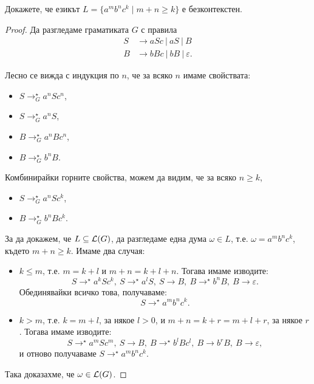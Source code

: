 \begin{framed}
  \begin{problem}
    Докажете, че езикът $L = \{a^mb^nc^k\mid m+n \geq k\}$ е безконтекстен.
  \end{problem}  
\end{framed}
\begin{proof}
  Да разгледаме граматиката $G$ с правила
  \begin{align*}
    S& \rightarrow aSc\ |\ aS\ |\ B\\
    B& \rightarrow bBc\ |\  bB\ |\ \varepsilon.
  \end{align*}
  
  Лесно се вижда с индукция по $n$, че за всяко $n$ имаме свойствата:
  \begin{itemize}
  \item 
    $S \rightarrow^\star_G a^nSc^n$,
  \item
    $S \rightarrow^\star_G a^nS$,
  \item
    $B \rightarrow^\star_G a^nBc^n$,
  \item
    $B \rightarrow^\star_G b^nB$.
  \end{itemize}
  Комбинирайки горните свойства, можем да видим, че за всяко $n \geq k$,
  \begin{itemize}
  \item 
    $S \rightarrow^\star_G a^nSc^k$,
  \item
    $B \rightarrow^\star_G b^nBc^k$.
  \end{itemize}
  За да докажем, че $L \subseteq \mathcal{L}(G)$, 
  да разгледаме една дума $\omega \in L$, т.е. $\omega = a^mb^nc^k$, където $m+n \geq k$.
  Имаме два случая:
  \begin{itemize}
  \item 
    $k \leq m$, т.е. $m = k+l$ и $m+n = k+l+n$.
    Тогава имаме изводите:
    \[S \rightarrow^\star a^kSc^k,\ S \rightarrow^\star a^lS,\ S \rightarrow B,\ B \rightarrow^\star b^nB,\ B \rightarrow \varepsilon.\]
    Обединявайки всичко това, получаваме:
    \[S \rightarrow^\star a^mb^nc^k.\]
  \item
    $k > m$, т.е. $k = m+l$, за някое $l > 0$, и $m+n = k+r = m+l+r$, за някое $r$.
    Тогава имаме изводите:
    \[S \rightarrow^\star a^mSc^m,\ S\rightarrow B,\ B\rightarrow^\star b^lBc^l,\ B\rightarrow b^rB,\ B\rightarrow\varepsilon,\]
    и отново получаваме $S \rightarrow^\star a^mb^nc^k$.
  \end{itemize}
  Така доказахме, че $\omega \in \mathcal{L}(G)$.
  

\end{proof}
